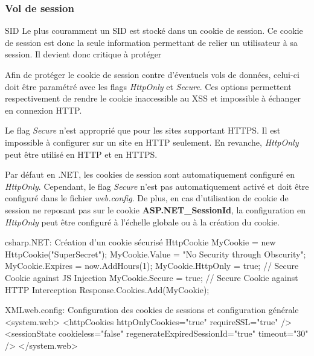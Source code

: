 \subsubsection{Vol de session}
\begin{Define}{SID}
Le plus couramment un \gls{SID} est stocké dans un cookie de session. Ce cookie de session est donc la seule information permettant de relier un utilisateur à sa session. Il devient donc critique à protéger
\end{Define}
\begin{Warning}
Afin de protéger le cookie de session contre d'éventuels vols de données, celui-ci doit être paramétré avec les flags \textit{HttpOnly}  et \textit{Secure}. Ces options permettent respectivement de rendre le cookie inaccessible au XSS et impossible à échanger en connexion HTTP. 
\end{Warning}
\begin{Stop}
Le flag \textit{Secure} n'est approprié que pour les sites supportant HTTPS. Il est impossible à configurer sur un site en HTTP seulement. En revanche, \textit{HttpOnly} peut être utilisé en HTTP et en HTTPS.
\end{Stop}

Par défaut en .NET, les cookies de session sont automatiquement configuré en \textit{HttpOnly}. Cependant, le flag \textit{Secure} n'est pas automatiquement activé et doit être configuré dans le fichier \textit{web.config}. De plus, en cas d'utilisation de cookie de session ne reposant pas sur le cookie \textbf{ASP.NET\_SessionId}, la configuration en \textit{HttpOnly} peut être configuré à l'échelle globale ou à la création du cookie.
\begin{Config}{csharp}{.NET: Création d'un cookie sécurisé}
HttpCookie MyCookie = new HttpCookie("SuperSecret");
MyCookie.Value = "No Security through Obscurity";
MyCookie.Expires = now.AddHours(1);
MyCookie.HttpOnly = true; // Secure Cookie against JS Injection
MyCookie.Secure = true; // Secure Cookie against HTTP Interception
Response.Cookies.Add(MyCookie);
\end{Config}
\begin{Config}{XML}{web.config: Configuration des cookies de sessions et configuration générale}
<system.web>
	<httpCookies httpOnlyCookies="true" requireSSL="true" />
	<sessionState
		cookieless="false"
		regenerateExpiredSessionId="true"
		timeout="30"
	/>
</system.web>
\end{Config}

